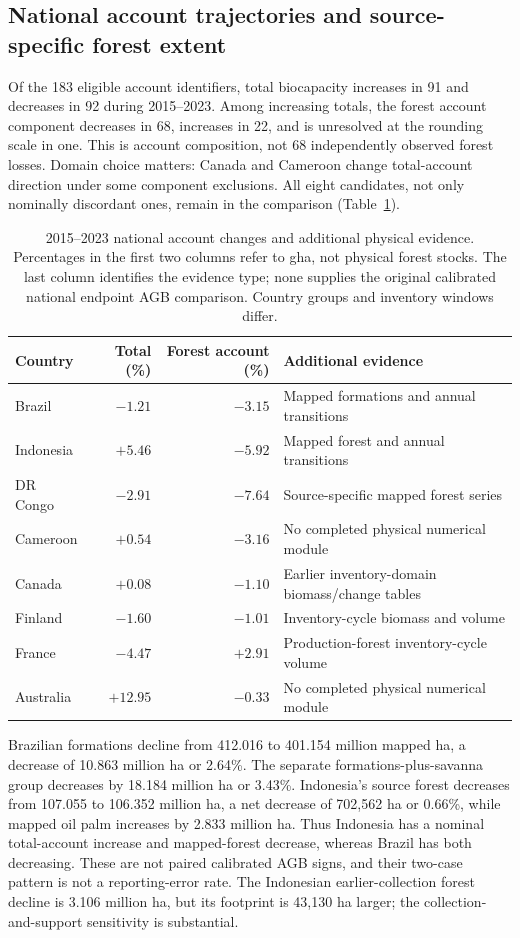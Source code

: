 \subsection{National account trajectories and source-specific forest extent}\label{sec:nationalresults}
Of the 183 eligible account identifiers, total biocapacity increases in 91 and decreases in 92 during 2015--2023. Among increasing totals, the forest account component decreases in 68, increases in 22, and is unresolved at the rounding scale in one. This is account composition, not 68 independently observed forest losses. Domain choice matters: Canada and Cameroon change total-account direction under some component exclusions. All eight candidates, not only nominally discordant ones, remain in the comparison (Table~\ref{tab:nationalcases}).

\begin{table}[htbp]
\centering\small
\caption{2015--2023 national account changes and additional physical evidence. Percentages in the first two columns refer to gha, not physical forest stocks. The last column identifies the evidence type; none supplies the original calibrated national endpoint AGB comparison. Country groups and inventory windows differ.}\label{tab:nationalcases}
\begin{tabularx}{\textwidth}{lrrX}
\toprule
Country & Total (\%) & Forest account (\%) & Additional evidence\\\midrule
Brazil & $-1.21$ & $-3.15$ & Mapped formations and annual transitions\\
Indonesia & $+5.46$ & $-5.92$ & Mapped forest and annual transitions\\
DR Congo & $-2.91$ & $-7.64$ & Source-specific mapped forest series\\
Cameroon & $+0.54$ & $-3.16$ & No completed physical numerical module\\
Canada & $+0.08$ & $-1.10$ & Earlier inventory-domain biomass/change tables\\
Finland & $-1.60$ & $-1.01$ & Inventory-cycle biomass and volume\\
France & $-4.47$ & $+2.91$ & Production-forest inventory-cycle volume\\
Australia & $+12.95$ & $-0.33$ & No completed physical numerical module\\
\bottomrule
\end{tabularx}
\end{table}

Brazilian formations decline from 412.016 to 401.154 million mapped ha, a decrease of 10.863 million ha or 2.64\%. The separate formations-plus-savanna group decreases by 18.184 million ha or 3.43\%. Indonesia's source forest decreases from 107.055 to 106.352 million ha, a net decrease of 702,562 ha or 0.66\%, while mapped oil palm increases by 2.833 million ha. Thus Indonesia has a nominal total-account increase and mapped-forest decrease, whereas Brazil has both decreasing. These are not paired calibrated AGB signs, and their two-case pattern is not a reporting-error rate. The Indonesian earlier-collection forest decline is 3.106 million ha, but its footprint is 43,130 ha larger; the collection-and-support sensitivity is substantial.

